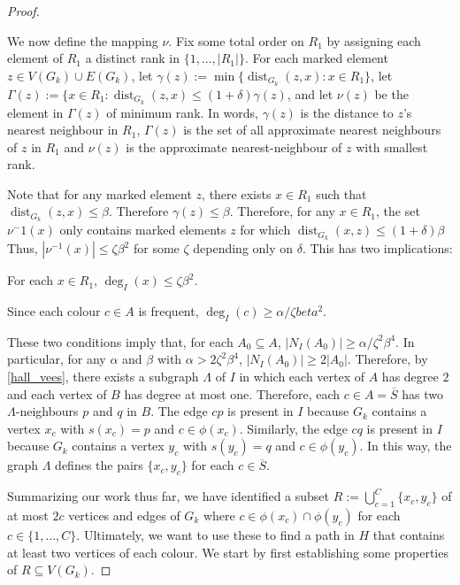 \documentclass{patmorin}
\DeclareMathOperator{\dist}{dist}
\begin{document}
\begin{proof}
\begin{compactenum}[{Stage} 1:]
    We now define the mapping $\nu$.  Fix some total order on $R_1$ by assigning each element of $R_1$ a distinct rank in $\{1,\ldots,|R_1|\}$.  For each marked element $z\in V(G_k)\cup E(G_k)$, let $\gamma(z):=\min\{\dist_{G_k}(z,x):x\in R_1\}$, let $\Gamma(z):=\{x\in R_1:\dist_{G_k}(z,x) \le (1+\delta)\gamma(z)$, and let $\nu(z)$ be the element in $\Gamma(z)$ of minimum rank.  In words, $\gamma(z)$ is the distance to $z$'s nearest neighbour in $R_1$, $\Gamma(z)$ is the set of all approximate nearest neighbours of $z$ in $R_1$ and $\nu(z)$ is the approximate nearest-neighbour of $z$ with smallest rank.

    Note that for any marked element $z$, there exists $x\in R_1$ such that $\dist_{G_k}(z,x)\le\beta$.  Therefore $\gamma(z)\le\beta$.  Therefore, for any $x\in R_1$, the set $\nu{^-1}(x)$ only contains marked elements $z$ for which $\dist_{G_k}(x,z)\le (1+\delta)\beta$  Thus, $|\nu^{-1}(x)|\le \zeta\beta^2$ for some $\zeta$ depending only on $\delta$. This has two implications:
    \begin{compactenum}
      \item For each $x\in R_1$,  $\deg_{I}(x) \le \zeta\beta^2$.
      \item Since each colour $c\in A$ is frequent, $\deg_I(c)\ge \alpha/\zeta beta^2$.
    \end{compactenum}
    These two conditions imply that, for each $A_0\subseteq A$, $|N_I(A_0)|\ge \alpha/\zeta^2\beta^4$.   In particular, for any $\alpha$ and $\beta$ with $\alpha > 2\zeta^2\beta^4$,  $|N_I(A_0)|\ge 2|A_0|$.  Therefore, by \cref{hall_vees}, there exists a subgraph $\Lambda$ of $I$ in which each vertex of $A$ has degree $2$ and each vertex of $B$ has degree at most one.  Therefore, each $c\in A=\overline{S}$ has two $\Lambda$-neighbours $p$ and $q$ in $B$.  The edge $cp$ is present in $I$ because $G_k$ contains a vertex $x_c$ with $s(x_c)=p$ and $c\in \phi(x_c)$.  Similarly, the edge $cq$ is present in $I$ because $G_k$ contains a vertex $y_c$ with $s(y_c)=q$ and $c\in\phi(y_c)$.  In this way, the graph $\Lambda$ defines the pairs $\{x_c,y_c\}$ for each $c\in\overline{S}$.
  \end{compactenum}

  Summarizing our work thus far, we have identified a subset  $R:=\bigcup_{c=1}^C\{x_c,y_c\}$ of at most $2c$ vertices and edges of $G_k$ where $c\in \phi(x_c)\cap \phi(y_c)$ for each $c\in\{1,\ldots,C\}$. Ultimately, we want to use these to find a path in $H$ that contains at least two vertices of each colour.  We start by first establishing some properties of $R\subseteq V(G_k)$.


\end{proof}
\end{document}
